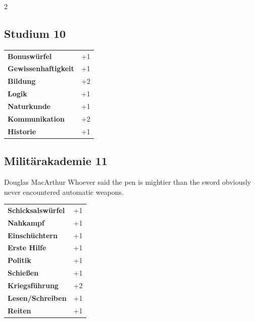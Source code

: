 \begin{multicols}{2}
\begin{tcolorbox}
\end{tcolorbox}

\begin{tcolorbox}
    \subsection*{Studium \hfill \small{10 }}
    \tcblower




\begin{tabular}{@{}ll@{}}
    \textbf{Bonuswürfel} & +1\\
    \textbf{Gewissenhaftigkeit} & +1\\
    \textbf{Bildung} & +2\\
    \textbf{Logik} & +1\\
    \textbf{Naturkunde} & +1\\
    \textbf{Kommunikation} & +2\\
    \textbf{Historie} & +1\\
\end{tabular}


\end{tcolorbox}

\begin{tcolorbox}
    \subsection*{Militärakademie \hfill \small{11 }}
    \tcblower


\begin{pquote}{Douglas MacArthur}
Whoever said the pen is mightier than the sword obviously never encountered automatic weapons.
\end{pquote}

\vspace{3mm}

\begin{tabular}{@{}ll@{}}
    \textbf{Schicksalswürfel} & +1\\
    \textbf{Nahkampf} & +1\\
    \textbf{Einschüchtern} & +1\\
    \textbf{Erste Hilfe} & +1\\
    \textbf{Politik} & +1\\
    \textbf{Schießen} & +1\\
    \textbf{Kriegsführung} & +2\\
    \textbf{Lesen/Schreiben} & +1\\
    \textbf{Reiten} & +1\\
\end{tabular}


\end{tcolorbox}
\end{multicols}
